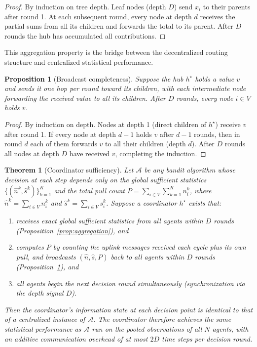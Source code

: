 \documentclass{article}
\newtheorem{proposition}{Proposition}
\newtheorem{theorem}{Theorem}
\begin{document}
\begin{proof}
By induction on tree depth. Leaf nodes (depth $D$) send $x_i$ to their parents after round 1. At each subsequent round, every node at depth $d$ receives the partial sums from all its children and forwards the total to its parent. After $D$ rounds the hub has accumulated all contributions.
\end{proof}

This aggregation property is the bridge between the decentralized routing structure and centralized statistical performance.

\begin{proposition}[Broadcast completeness]
\label{prop:broadcast}
Suppose the hub $h^\star$ holds a value $v$ and sends it one hop per round toward its children, with each intermediate node forwarding the received value to all its children. After $D$ rounds, every node $i \in V$ holds $v$.
\end{proposition}

\begin{proof}
By induction on depth. Nodes at depth 1 (direct children of $h^\star$) receive $v$ after round 1. If every node at depth $d-1$ holds $v$ after $d-1$ rounds, then in round $d$ each of them forwards $v$ to all their children (depth $d$). After $D$ rounds all nodes at depth $D$ have received $v$, completing the induction.
\end{proof}

\begin{theorem}[Coordinator sufficiency]
\label{thm:coordinator}
Let $\mathcal{A}$ be any bandit algorithm whose decision at each step depends only on the global sufficient statistics $\{(\hat{n}^k, \hat{s}^k)\}_{k=1}^K$ and the total pull count $P = \sum_{i \in V}\sum_{k=1}^K n_i^k$, where $\hat{n}^k = \sum_{i \in V} n_i^k$ and $\hat{s}^k = \sum_{i \in V} s_i^k$. Suppose a coordinator $h^\star$ exists that:
\begin{enumerate}
    \item receives exact global sufficient statistics from all agents within $D$ rounds (Proposition~\ref{prop:aggregation}), and
    \item computes $P$ by counting the uplink messages received each cycle plus its own pull, and broadcasts $(\hat{n}, \hat{s}, P)$ back to all agents within $D$ rounds (Proposition~\ref{prop:broadcast}), and
    \item all agents begin the next decision round simultaneously (synchronization via the depth signal $D$).
\end{enumerate}
Then the coordinator's information state at each decision point is identical to that of a centralized instance of $\mathcal{A}$. The coordinator therefore achieves the same statistical performance as $\mathcal{A}$ run on the pooled observations of all $N$ agents, with an additive communication overhead of at most $2D$ time steps per decision round.
\end{theorem}
\end{document}
